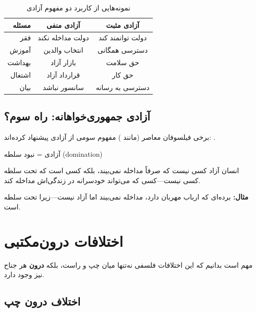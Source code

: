 \vspace{-8pt}

\begin{table}[H]
	\centering
	\caption{نمونه‌هایی از کاربرد دو مفهوم آزادی}
	\label{tab:freedom-examples}
	\setlength{\tabcolsep}{4pt}
	\begin{tabular}{r|c|c}
		\toprule
		\textbf{مسئله} & \textbf{آزادی منفی} & \textbf{آزادی مثبت} \\
		\midrule
		فقر & دولت مداخله نکند & دولت توانمند کند \\
		آموزش & انتخاب والدین & دسترسی همگانی \\
		بهداشت & بازار آزاد & حق سلامت \\
		اشتغال & قرارداد آزاد & حق کار \\
		بیان & سانسور نباشد & دسترسی به رسانه \\
		\bottomrule
	\end{tabular}
\end{table}

\vspace{-6pt}

\subsection{آزادی جمهوری‌خواهانه: راه سوم؟}

برخی فیلسوفان معاصر (مانند ) مفهوم سومی از آزادی پیشنهاد کرده‌اند: .

\begin{defbox}
	آزادی = نبود سلطه (domination)
	
	انسان آزاد کسی نیست که صرفاً مداخله نمی‌بیند، بلکه کسی است که تحت سلطه کسی نیست—کسی که می‌تواند خودسرانه در زندگی‌اش مداخله کند.
	
	\textbf{مثال:} برده‌ای که ارباب مهربان دارد، مداخله نمی‌بیند اما آزاد نیست—زیرا تحت سلطه است.
\end{defbox}

\section{اختلافات درون‌مکتبی}

مهم است بدانیم که این اختلافات فلسفی نه‌تنها میان چپ و راست، بلکه \textbf{درون} هر جناح نیز وجود دارد.

\subsection{اختلاف درون چپ}

